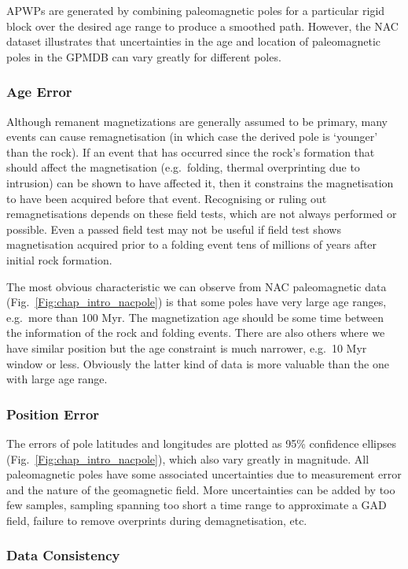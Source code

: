 APWPs are generated by combining paleomagnetic poles for a particular rigid
block over the desired age range to produce a smoothed path. However, the NAC
dataset illustrates that uncertainties in the age and location of paleomagnetic
poles in the GPMDB can vary greatly for different poles.

\subsubsection{Age Error}

Although remanent magnetizations are generally assumed to be primary, many
events can cause remagnetisation (in which case the derived pole is `younger'
than the rock). If an event that has occurred since the rock's formation that
should affect the magnetisation (e.g.\ folding, thermal overprinting due to
intrusion) can be shown to have affected it, then it constrains the
magnetisation to have been acquired before that event. Recognising or ruling
out remagnetisations depends on these field tests, which are not always
performed or possible. Even a passed field test may not be useful if field test
shows magnetisation acquired prior to a folding event tens of millions of years
after initial rock formation.

The most obvious characteristic we can observe from NAC paleomagnetic data
(Fig.~\ref{Fig:chap_intro_nacpole}) is that some poles have very large age
ranges, e.g.\ more than 100 Myr. The magnetization age should be some time
between the information of the rock and folding events. There are also others
where we have similar position but the age constraint is much narrower, e.g.\ 10
Myr window or less. Obviously the latter kind of data is more valuable than the
one with large age range.

\subsubsection{Position Error}

The errors of pole latitudes and longitudes are plotted as 95\% confidence
ellipses (Fig.~\ref{Fig:chap_intro_nacpole}), which also vary greatly in magnitude.
All paleomagnetic poles have some associated uncertainties due to measurement
error and the nature of the geomagnetic field. More uncertainties can be added
by too few samples, sampling spanning too short a time range to approximate a
GAD field, failure to remove overprints during demagnetisation, etc.

\subsubsection{Data Consistency}

